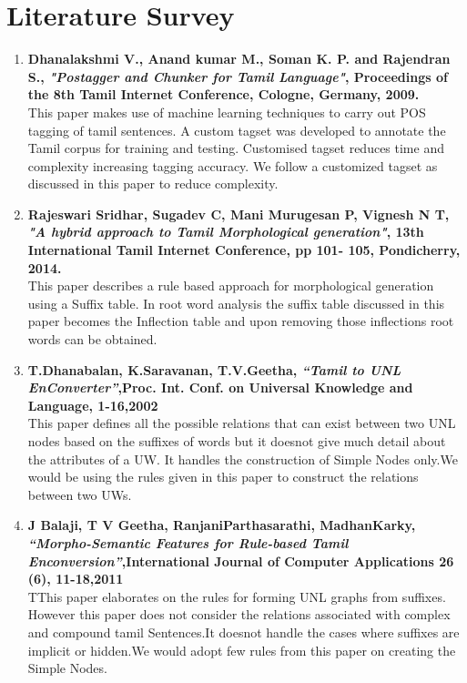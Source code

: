 \documentclass{article}
\begin{document}
\section{Literature Survey}\large
\begin{enumerate}
\item \textbf{Dhanalakshmi V., Anand kumar M., Soman K. P. and Rajendran S., \textit{"Postagger and Chunker for Tamil Language"}, Proceedings of the 8th Tamil Internet Conference, Cologne, Germany, 2009.}
\\This paper makes use of machine learning techniques to carry out POS tagging of tamil sentences. A custom tagset was developed to annotate the Tamil corpus for training and testing. Customised tagset reduces time and complexity increasing tagging accuracy. We follow a customized tagset as discussed in this paper to reduce complexity.

\item \textbf{Rajeswari Sridhar, Sugadev C, Mani Murugesan P, Vignesh N T,  \textit{"A hybrid approach to Tamil Morphological generation"}, 13th International Tamil Internet Conference, pp 101- 105, Pondicherry, 2014.}
\\This paper describes a rule based approach for morphological generation using a Suffix table. In root word analysis the suffix table discussed in this paper becomes the Inflection table and upon removing those inflections root words can be obtained.

\item \textbf{T.Dhanabalan, K.Saravanan, T.V.Geetha, \textit{“Tamil to UNL EnConverter”},Proc. Int. Conf. on Universal Knowledge and Language, 1-16,2002}
\\This paper defines all the possible relations that can exist between two UNL nodes based on the suffixes of words but it doesnot give much detail about the attributes of a UW. It handles the construction of Simple Nodes only.We would be using the rules given in this paper to construct the relations between two UWs.

\item \textbf{J Balaji, T V Geetha, RanjaniParthasarathi,  MadhanKarky, \textit{“Morpho-Semantic Features for Rule-based Tamil Enconversion”},International Journal of Computer Applications 26 (6), 11-18,2011} 
\\TThis paper elaborates on the rules for forming UNL graphs from suffixes. However this paper does not consider the relations associated with complex and compound tamil Sentences.It doesnot handle the cases where suffixes are implicit or hidden.We would adopt few rules from this paper on creating the Simple Nodes.



\end{enumerate}
\end{document}
